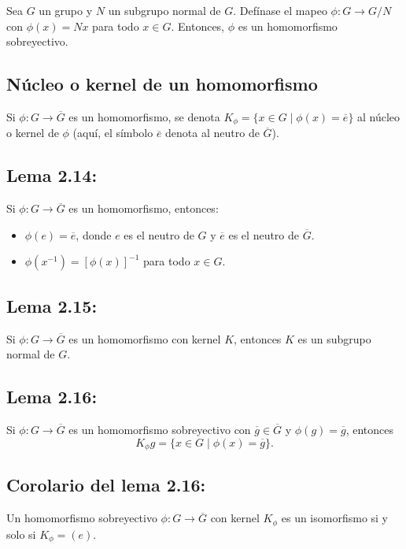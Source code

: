 \documentclass{article}
\begin{document}
Sea $G$ un grupo y $N$ un subgrupo normal de $G$. Defínase el mapeo $\phi:G\to G/N$ con $\phi(x)=Nx$ para todo $x\in G$. Entonces, $\phi$ es un homomorfismo sobreyectivo.

\subsection*{\color{violet} Núcleo o kernel de un homomorfismo}

Si $\phi:G\to\overline{G}$ es un homomorfismo, se denota $K_{\phi}=\{x\in G\mid \phi(x)=\overline{e}\}$ al núcleo o kernel de $\phi$ (aquí, el símbolo $\overline{e}$ denota al neutro de $\overline{G}$).

\subsection*{\color{blue} Lema 2.14:}

Si $\phi:G\to\overline{G}$ es un homomorfismo, entonces:
\begin{itemize}
\item $\phi(e)=\overline{e}$, donde $e$ es el neutro de $G$ y $\overline{e}$ es el neutro de $\overline{G}$.

\item $\phi(x^{-1})=[\phi(x)]^{-1}$ para todo $x\in G$.
\end{itemize}

\subsection*{\color{blue} Lema 2.15:}

Si $\phi:G\to\overline{G}$ es un homomorfismo con kernel $K$, entonces $K$ es un subgrupo normal de $G$.

\subsection*{\color{blue} Lema 2.16:}

Si $\phi:G\to\overline{G}$ es un homomorfismo sobreyectivo con $\overline{g}\in\overline{G}$ y $\phi(g)=\overline{g}$, entonces 
$$K_{\phi}g=\{x\in G\mid \phi(x)=\overline{g}\}.$$

\subsection*{\color{blue} Corolario del lema 2.16:}

Un homomorfismo sobreyectivo $\phi:G\to\overline{G}$ con kernel $K_{\phi}$ es un isomorfismo si y solo si $K_{\phi}=(e)$.
\end{document}
